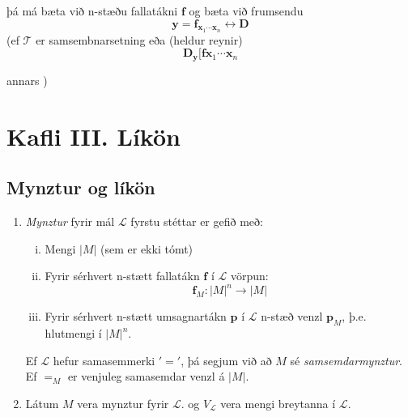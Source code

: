 \documentclass[12pt]{article}
\begin{document}
þá má bæta við n-stæðu fallatákni $\mathbf{f}$ og bæta við frumsendu
\[ \mathbf{y} = \mathbf{f}_{\mathbf{x}_1 \dotsb \mathbf{x}_n} \leftrightarrow \mathbf{D} \]
(ef $\mathcal{T}$ er samsembnarsetning eða (heldur reynir)
\[ \mathbf{D}_{\mathbf{y}} [\mathbf{f} \mathbf{x}_1 \dotsb \mathbf{x}_n \]

annars )


\section{Kafli III. Líkön}

\subsection{Mynztur og líkön}

\begin{skgr}
  \begin{enumerate}[(1)]
  \item  \emph{Mynztur} fyrir mál \(\mathcal{L} \) fyrstu stéttar er gefið með:
    \begin{enumerate}[(i)]
    \item  Mengi \(|M| \) (sem er ekki tómt)
    \item  Fyrir sérhvert n-stætt fallatákn \(\mathbf{f}\) í \(\mathcal{L}\)
       vörpun: 
       \[ \mathbf{f}_{M}: |M|^n \rightarrow |M| \]
     \item Fyrir sérhvert n-stætt umsagnartákn \(\mathbf{p} \) í \(\mathcal{L}\)
       n-stæð venzl $\mathbf{p}_{M}$, þ.e. hlutmengi í $|M|^{n}$.
    \end{enumerate}
    Ef $\mathcal{L}$ hefur samasemmerki $'='$, þá segjum við að $M$ sé 
    \emph{samsemdarmynztur}. Ef $=_{M}$ er venjuleg samasemdar venzl á $|M|$.
  \item Látum $M$ vera mynztur fyrir $\mathcal{L}$. og $V_{\mathcal{L}}$ vera mengi breytanna í $\mathcal{L}$.


\end{enumerate}
\end{skgr}
\end{document}
